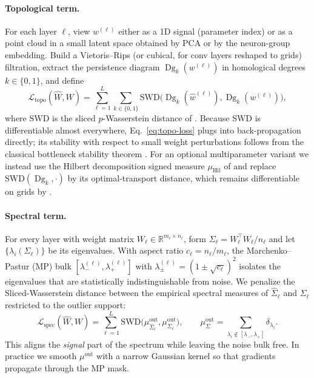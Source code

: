 \documentclass{article}
\newcommand{\SWD}{\mathrm{SWD}}
\newcommand{\Dg}{\operatorname{Dg}}
\begin{document}
\paragraph{Topological term.}
For each layer $\ell$, view $w^{(\ell)}$ either as a 1D signal
(parameter index) or as a point cloud in a small latent space obtained by
PCA or by the neuron-group embedding.  Build a Vietoris--Rips (or
cubical, for conv layers reshaped to grids) filtration, extract the
persistence diagram $\Dg_k(w^{(\ell)})$ in homological degrees
$k\in\{0,1\}$, and define
\begin{equation}
\mathcal{L}_{\text{topo}}(\hat W,W)
= \sum_{\ell=1}^{L}\sum_{k\in\{0,1\}}
  \SWD\!\bigl(\Dg_k(\hat w^{(\ell)}),\Dg_k(w^{(\ell)})\bigr),
\label{eq:topo-loss}
\end{equation}
where $\SWD$ is the sliced $p$-Wasserstein distance of
\citet{carriereSlicedWassersteinKernel2017}.  Because $\SWD$ is
differentiable almost everywhere, Eq.~\eqref{eq:topo-loss} plugs into
back-propagation directly; its stability with respect to small weight
perturbations follows from the classical bottleneck stability theorem
\citep{oudotAlgebraicIntroductionPersistence2026}.  For an optional
multiparameter variant we instead use the Hilbert decomposition signed
measure $\mu_{\mathrm{Hil}}$ of \citet{loiseauxStableVectorizationMultiparameter2024a}
and replace $\SWD(\Dg_k,\cdot)$ by its optimal-transport distance, which
remains differentiable on grids by
\citet{scoccolaDifferentiabilityOptimizationMultiparameter2024}.

\paragraph{Spectral term.}
For every layer with weight matrix $W_\ell\in\mathbb{R}^{m_\ell\times
n_\ell}$, form $\Sigma_\ell = W_\ell^\top W_\ell / n_\ell$ and let
$\{\lambda_i(\Sigma_\ell)\}$ be its eigenvalues.  With aspect ratio
$c_\ell=n_\ell/m_\ell$, the Marchenko--Pastur (MP) bulk
$[\lambda_-^{(\ell)},\lambda_+^{(\ell)}]$ with
$\lambda_\pm^{(\ell)}=(1\pm\sqrt{c_\ell})^2$ isolates the eigenvalues that
are statistically indistinguishable from noise.  We penalize the
Sliced-Wasserstein distance between the empirical spectral measures of
$\hat\Sigma_\ell$ and $\Sigma_\ell$ restricted to the outlier support:
\begin{equation}
\mathcal{L}_{\text{spec}}(\hat W,W)
= \sum_{\ell=1}^{L}
  \SWD\!\bigl(\mu^{\text{out}}_{\hat\Sigma_\ell},\mu^{\text{out}}_{\Sigma_\ell}\bigr),
\qquad
\mu^{\text{out}}_\Sigma
= \sum_{\lambda_i\notin[\lambda_-,\lambda_+]}\delta_{\lambda_i}.
\end{equation}
This aligns the \emph{signal} part of the spectrum while leaving the noise
bulk free.  In practice we smooth $\mu^{\text{out}}$ with a narrow
Gaussian kernel so that gradients propagate through the MP mask.
\end{document}
